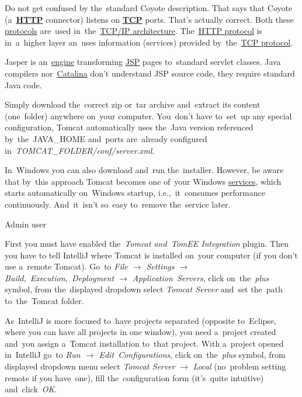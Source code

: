 \warning Do not get confused by the~standard Coyote description.
That says that Coyote (a~\hyperref[http]{\textbf{HTTP}} connector) listens on \hyperref[tcp]{\textbf{TCP}} ports.
That's actually correct.
Both these \hyperref[protocolstandard]{protocols} are~used in~the~\hyperref[tcpip]{TCP/IP architecture}.
The~\hyperref[http]{HTTP protocol} is in~a~higher layer an~uses information (services) provided by~the~\hyperref[tcp]{TCP protocol}.

Jasper is an~\hyperref[engine]{engine} transforming \hyperref[jsp]{JSP} pages to~standard servlet classes.
Java compilers nor~\hyperref[catalina]{Catalina} don't understand JSP source code, they require standard Java code.

Simply download the~correct zip or~tar archive and~extract its content (one~folder) anywhere on~your computer.
You~don't have to~set~up any special configuration, Tomcat automatically uses the~Java version referenced by~the~JAVA\_HOME and~ports are~already configured in~\textit{TOMCAT\_FOLDER/conf/server.xml}.

\warning In~Windows you can also download and~run the~installer.
However, be aware that by~this approach Tomcat becomes one of~your Windows \hyperref[applicationprocessprogramservicethread]{services}, which starts automatically on~Windows startup, i.e.,~it~consumes performance continuously.
And~it~isn't so~easy to~remove the~service later.

\todo Admin user




First you must have enabled the~\textit{Tomcat and~TomEE Integration} plugin.
Then you have to tell IntelliJ where Tomcat is installed on~your computer (if you don't use a~remote Tomcat).
Go~to \textit{File $\rightarrow$ Settings $\rightarrow$ Build,~Execution,~Deployment $\rightarrow$ Application~Servers}, click on~the~\textit{plus} symbol, from the~displayed dropdown select \textit{Tomcat Server} and~set the~path to~the~Tomcat folder.

As~IntelliJ is more focused to~have projects separated (opposite to~Eclipse, where you can have all projects in one window), you need a~project created and~you assign a~Tomcat installation to~that project.
With a~project opened in~IntelliJ go~to \textit{Run $\rightarrow$ Edit~Configurations}, click on~the~\textit{plus} symbol, from displayed dropdown menu select \textit{Tomcat Server} $\rightarrow$ \textit{Local} (no~problem setting remote if you have~one), fill the~configuration form (it's~quite intuitive) and~click~\textit{OK}.

